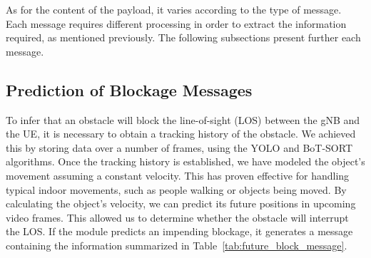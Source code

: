 As for the content of the payload, it varies according to the type of message.
Each message requires different processing in order to extract the information required, as mentioned previously.
The following subsections present further each message.

\subsection{Prediction of Blockage Messages}\label{subsec:prediction-of-blockage-messages}

To infer that an obstacle will block the line-of-sight (LOS) between the gNB and the UE, it is necessary to obtain a tracking history of the obstacle.
We achieved this by storing data over a number of frames, using the YOLO and BoT-SORT algorithms.
Once the tracking history is established, we have modeled the object's movement assuming a constant velocity.
This has proven effective for handling typical indoor movements, such as people walking or objects being moved.
By calculating the object's velocity, we can predict its future positions in upcoming video frames.
This allowed us to determine whether the obstacle will interrupt the LOS\@.
If the module predicts an impending blockage, it generates a message containing the information summarized in Table~\ref{tab:future_block_message}.


\begin{table}[H]
    \caption{Components of the Prediction of Blockage Payload}
    \label{tab:future_block_message}
    \centering
\end{table}




